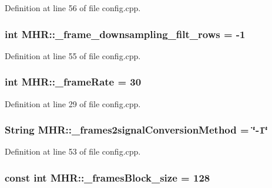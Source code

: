 Definition at line 56 of file config.\+cpp.

\hypertarget{namespace_m_h_r_a41fcc40bb1f54975292b8d7051b7b3f9}{
\subsubsection[{\+\_\+frame\+\_\+downsampling\+\_\+filt\+\_\+rows}]{\setlength{\rightskip}{0pt plus 5cm}int M\+H\+R\+::\+\_\+frame\+\_\+downsampling\+\_\+filt\+\_\+rows = -\/1}}\label{namespace_m_h_r_a41fcc40bb1f54975292b8d7051b7b3f9}


Definition at line 55 of file config.\+cpp.

\hypertarget{namespace_m_h_r_a8c0f2199ebe2a27a2fc0cff1daa239ee}{
\subsubsection[{\+\_\+frame\+Rate}]{\setlength{\rightskip}{0pt plus 5cm}int M\+H\+R\+::\+\_\+frame\+Rate = 30}}\label{namespace_m_h_r_a8c0f2199ebe2a27a2fc0cff1daa239ee}


Definition at line 29 of file config.\+cpp.

\hypertarget{namespace_m_h_r_aaaae88f4be078b944fe63b49c5022684}{
\subsubsection[{\+\_\+frames2signal\+Conversion\+Method}]{\setlength{\rightskip}{0pt plus 5cm}String M\+H\+R\+::\+\_\+frames2signal\+Conversion\+Method = \char`\"{}-\/1\char`\"{}}}\label{namespace_m_h_r_aaaae88f4be078b944fe63b49c5022684}


Definition at line 53 of file config.\+cpp.

\hypertarget{namespace_m_h_r_a167cff7309df5114f9e72af8b5e820c1}{
\subsubsection[{\+\_\+frames\+Block\+\_\+size}]{\setlength{\rightskip}{0pt plus 5cm}const int M\+H\+R\+::\+\_\+frames\+Block\+\_\+size = 128}}\label{namespace_m_h_r_a167cff7309df5114f9e72af8b5e820c1}


